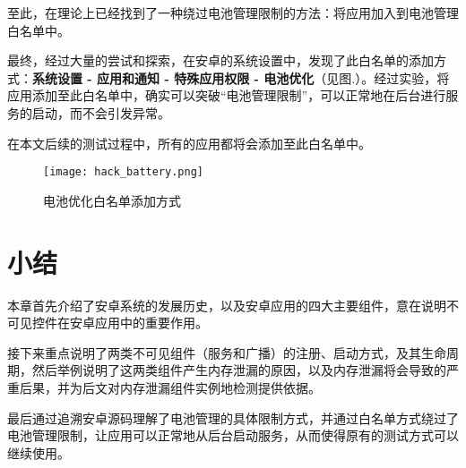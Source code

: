 至此，在理论上已经找到了一种绕过电池管理限制的方法：将应用加入到电池管理白名单中。

最终，经过大量的尝试和探索，在安卓的系统设置中，发现了此白名单的添加方式：\textbf{系统设置 - 应用和通知 - 特殊应用权限 - 电池优化}（见图.\redbf{\ref{fig:hack-battery}}）。经过实验，将应用添加至此白名单中，确实可以突破“电池管理限制”，可以正常地在后台进行服务的启动，而不会引发异常。

在本文后续的测试过程中，所有的应用都将会添加至此白名单中。

\begin{figure}[htbp]
	\centering
	\texttt{[image: hack\_battery.png]} %
	\caption{电池优化白名单添加方式}
	\label{fig:hack-battery}
\end{figure}

\section{小结}

本章首先介绍了安卓系统的发展历史，以及安卓应用的四大主要组件，意在说明不可见控件在安卓应用中的重要作用。

接下来重点说明了两类不可见组件（服务和广播）的注册、启动方式，及其生命周期，然后举例说明了这两类组件产生内存泄漏的原因，以及内存泄漏将会导致的严重后果，并为后文对内存泄漏组件实例地检测提供依据。

最后通过追溯安卓源码理解了电池管理的具体限制方式，并通过白名单方式绕过了电池管理限制，让应用可以正常地从后台启动服务，从而使得原有的测试方式可以继续使用。